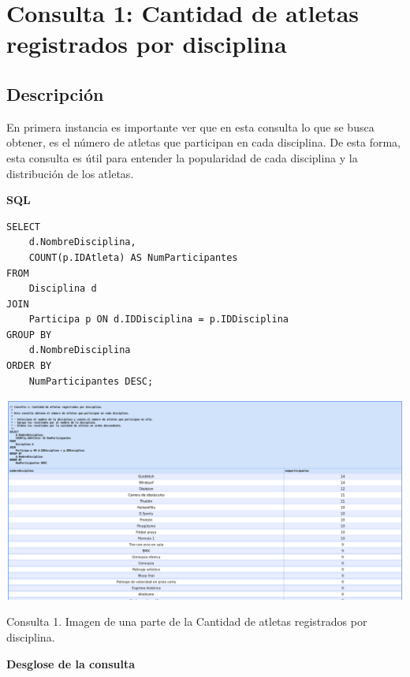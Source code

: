 \section*{Consulta 1: Cantidad de atletas registrados por disciplina}

\subsection*{Descripción}
En primera instancia es importante ver que en esta consulta lo que se busca obtener, es el número de atletas que participan en cada disciplina. De esta forma, esta consulta es útil para entender la popularidad de cada disciplina y la distribución de los atletas.

\textbf{SQL}

\begin{verbatim}
SELECT 
    d.NombreDisciplina,
    COUNT(p.IDAtleta) AS NumParticipantes
FROM 
    Disciplina d
JOIN 
    Participa p ON d.IDDisciplina = p.IDDisciplina
GROUP BY 
    d.NombreDisciplina
ORDER BY 
    NumParticipantes DESC;
\end{verbatim}

\begin{center}
    \includegraphics[width=16.5cm]{../resources/Chapters/Consultas/Imagenes/Consulta1.jpeg} 
    
   Consulta 1. Imagen de una parte de la Cantidad de atletas registrados por disciplina.
\end{center}

\textbf{Desglose de la consulta}

